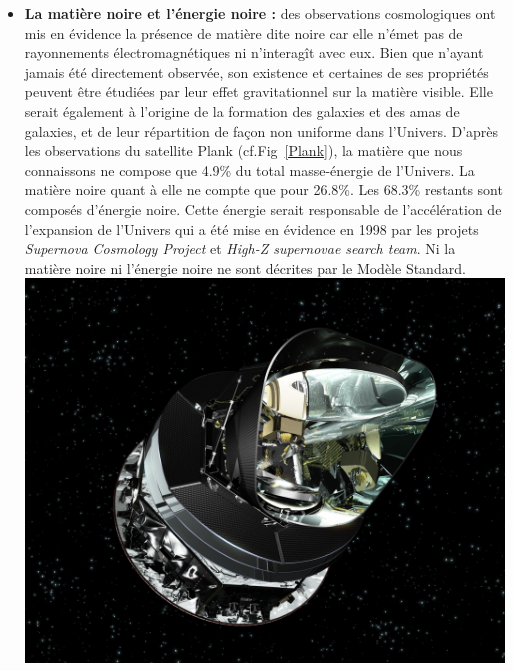\begin{itemize}[label=$\bullet$]
\item \textbf{La matière noire et l'énergie noire :} des observations cosmologiques ont mis en évidence la présence de matière dite noire car elle n'émet pas de rayonnements électromagnétiques ni n'interagît avec eux. Bien que n'ayant jamais été directement observée, son existence et certaines de ses propriétés peuvent être étudiées par leur effet gravitationnel sur la matière visible. Elle serait  également à l'origine de la formation des galaxies et des amas de galaxies, et de leur répartition de façon non uniforme dans l'Univers. D'après les observations du satellite Plank (cf.Fig~\ref{Plank}), la matière que nous connaissons ne compose que \num{4.9}\% du total masse-énergie de l'Univers. La matière noire quant à elle ne compte que pour \num{26.8}\%. Les \num{68.3}\% restants sont composés d'énergie noire. Cette énergie serait responsable de l'accélération de l'expansion de l'Univers qui a été mise en évidence en \num{1998} par les projets \textit{Supernova Cosmology Project} et \textit{High-Z supernovae search team}. Ni la matière noire ni l'énergie noire ne sont décrites par le Modèle Standard.
\marginpar
{
\centering
\includegraphics[width=\marginparwidth]{SM/plank.jpg}
\label{Plank}
} 


\end{itemize}
